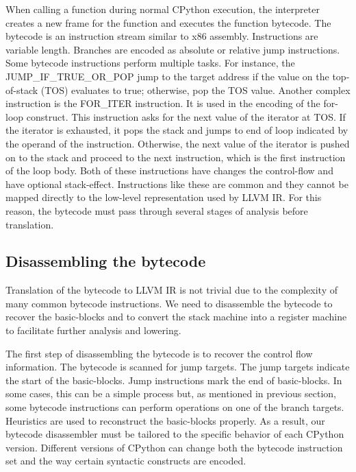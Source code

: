 \documentclass{sig-alternate}
\begin{document}
When calling a function during normal CPython execution, the
interpreter creates a new frame for the function and executes the
function bytecode.  The bytecode is an instruction stream similar to
x86 assembly.  Instructions are variable length. Branches are encoded
as absolute or relative jump instructions. Some bytecode instructions
perform multiple tasks.  For instance, the
JUMP\_IF\_TRUE\_OR\_POP jump to the target address if the
value on the top-of-stack (TOS) evaluates to true; otherwise, pop the
TOS value.  Another complex instruction is the FOR\_ITER instruction.
It is used in the encoding of the for-loop construct.  This
instruction asks for the next value of the iterator at TOS.  If the
iterator is exhausted, it pops the stack and jumps to end of loop
indicated by the operand of the instruction.  Otherwise, the next
value of the iterator is pushed on to the stack and proceed to the
next instruction, which is the first instruction of the loop
body. Both of these instructions have changes the control-flow and
have optional stack-effect. \cite{pythondoc:dis} Instructions like
these are common and they cannot be mapped directly to the low-level
representation used by LLVM IR.  For this reason, the bytecode must
pass through several stages of analysis before translation.

\subsection{Disassembling the bytecode}

Translation of the bytecode to LLVM IR is not trivial due to the
complexity of many common bytecode instructions.  We need to disassemble
the bytecode to recover the basic-blocks and to convert the stack machine into
a register machine to facilitate further analysis and lowering.

The first step of disassembling the bytecode is to recover the control
flow information. The bytecode is scanned for jump targets. The jump
targets indicate the start of the basic-blocks.  Jump instructions
mark the end of basic-blocks. In some cases, this can be a simple
process but, as mentioned in previous section, some bytecode
instructions can perform operations on one of the branch targets.
Heuristics are used to reconstruct the basic-blocks properly. As a
result, our bytecode disassembler must be tailored to the specific
behavior of each CPython version.  Different versions of CPython can
change both the bytecode instruction set and the way certain syntactic
constructs are encoded.
\end{document}
